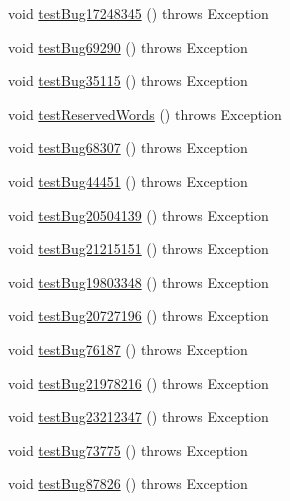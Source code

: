 \begin{DoxyCompactItemize}
\item 
void \mbox{\hyperlink{classtestsuite_1_1regression_1_1_meta_data_regression_test_a5eb8eb8d010b18e3193a85380d5483ba}{test\+Bug17248345}} ()  throws Exception 
\item 
void \mbox{\hyperlink{classtestsuite_1_1regression_1_1_meta_data_regression_test_a415c490c795a8501bb347c435a223360}{test\+Bug69290}} ()  throws Exception 
\item 
void \mbox{\hyperlink{classtestsuite_1_1regression_1_1_meta_data_regression_test_a73c2bf687084e2bc8c33f56cce84bdbf}{test\+Bug35115}} ()  throws Exception 
\item 
void \mbox{\hyperlink{classtestsuite_1_1regression_1_1_meta_data_regression_test_af85d61fc6d842052ba712ccdda0fd77a}{test\+Reserved\+Words}} ()  throws Exception 
\item 
void \mbox{\hyperlink{classtestsuite_1_1regression_1_1_meta_data_regression_test_a7546dce3979e1d5f2f28703337b00e62}{test\+Bug68307}} ()  throws Exception 
\item 
void \mbox{\hyperlink{classtestsuite_1_1regression_1_1_meta_data_regression_test_ad048c86a8dc4f574eae4004473ceaa6f}{test\+Bug44451}} ()  throws Exception 
\item 
void \mbox{\hyperlink{classtestsuite_1_1regression_1_1_meta_data_regression_test_ae79b95fa80f4d41af56448aa53d865bb}{test\+Bug20504139}} ()  throws Exception 
\item 
void \mbox{\hyperlink{classtestsuite_1_1regression_1_1_meta_data_regression_test_ae3ea7a46828ed0725464d309295a2663}{test\+Bug21215151}} ()  throws Exception 
\item 
void \mbox{\hyperlink{classtestsuite_1_1regression_1_1_meta_data_regression_test_ae07cbe1ade492b69942cdbb52c4ef65a}{test\+Bug19803348}} ()  throws Exception 
\item 
void \mbox{\hyperlink{classtestsuite_1_1regression_1_1_meta_data_regression_test_a4c0d9aaa7ffb0619d60cd9801b2afcba}{test\+Bug20727196}} ()  throws Exception 
\item 
void \mbox{\hyperlink{classtestsuite_1_1regression_1_1_meta_data_regression_test_a59b663373c79eec136ca0c2473dac25c}{test\+Bug76187}} ()  throws Exception 
\item 
void \mbox{\hyperlink{classtestsuite_1_1regression_1_1_meta_data_regression_test_a375e1a8c67204d8fcbbca1bd9957881d}{test\+Bug21978216}} ()  throws Exception 
\item 
void \mbox{\hyperlink{classtestsuite_1_1regression_1_1_meta_data_regression_test_ab3ee32d4d432ff0acdba1990e9dde9ba}{test\+Bug23212347}} ()  throws Exception 
\item 
void \mbox{\hyperlink{classtestsuite_1_1regression_1_1_meta_data_regression_test_ab626be438fcdf7bbb6d528f00a7dda1d}{test\+Bug73775}} ()  throws Exception 
\item 
void \mbox{\hyperlink{classtestsuite_1_1regression_1_1_meta_data_regression_test_a0182fb63c3dfdf76644200cbca0614db}{test\+Bug87826}} ()  throws Exception 
\end{DoxyCompactItemize}
